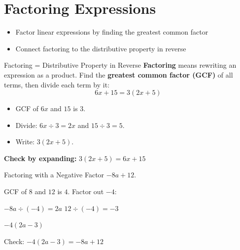 \section{Factoring Expressions}

\begin{learningGoals}
\begin{itemize}
    \item Factor linear expressions by finding the greatest common factor
    \item Connect factoring to the distributive property in reverse
\end{itemize}
\end{learningGoals}

\begin{conceptBox}{Factoring = Distributive Property in Reverse}
\textbf{Factoring} means rewriting an expression as a product.
Find the \textbf{greatest common factor (GCF)} of all terms, then divide each term by it:
$$6x + 15 = 3(2x + 5)$$
\begin{itemize}[leftmargin=*]
    \item GCF of $6x$ and $15$ is $3$.
    \item Divide: $6x \div 3 = 2x$ and $15 \div 3 = 5$.
    \item Write: $3(2x + 5)$.
\end{itemize}
\textbf{Check by expanding:} $3(2x + 5) = 6x + 15$ \checkmark
\end{conceptBox}

\begin{workedExample}{Factoring with a Negative}
Factor $-8a + 12$.

GCF of $8$ and $12$ is $4$. Factor out $-4$:

$-8a \div (-4) = 2a$ \qquad $12 \div (-4) = -3$

$-4(2a - 3)$

Check: $-4(2a - 3) = -8a + 12$ \checkmark
{}
\end{workedExample}


